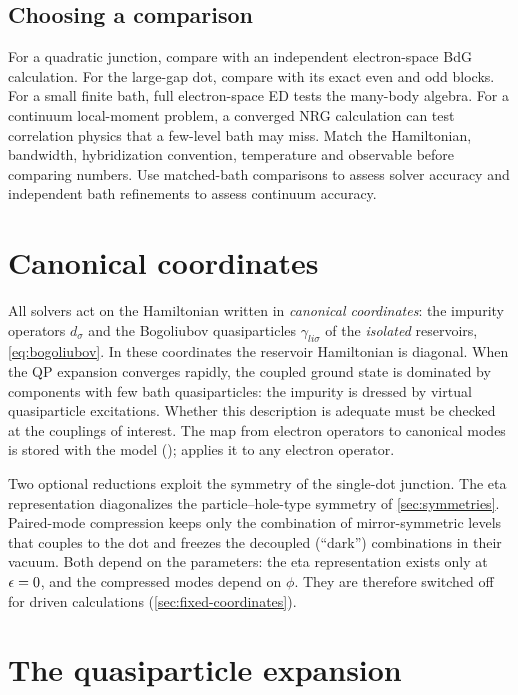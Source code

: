 \subsection{Choosing a comparison}

For a quadratic junction, compare with an independent electron-space BdG
calculation. For the large-gap dot, compare with its exact even and odd blocks.
For a small finite bath, full electron-space ED tests the many-body algebra.
For a continuum local-moment problem, a converged NRG calculation can test
correlation physics that a few-level bath may miss. Match the Hamiltonian,
bandwidth, hybridization convention, temperature and observable before comparing
numbers. Use matched-bath comparisons to assess solver accuracy and independent
bath refinements to assess continuum accuracy.

\section{Canonical coordinates}\label{sec:coordinates}

All solvers act on the Hamiltonian written in \emph{canonical coordinates}: the impurity
operators $d_\sigma$ and the Bogoliubov quasiparticles $\gamma_{li\sigma}$ of the
\emph{isolated} reservoirs, \cref{eq:bogoliubov}. In these coordinates the reservoir
Hamiltonian is diagonal. When the QP expansion converges rapidly, the coupled
ground state is dominated by components with few bath quasiparticles: the
impurity is dressed by virtual quasiparticle excitations. Whether this description
is adequate must be checked at the couplings of interest. The
map from electron operators to canonical modes is stored with the model
();  applies it to any electron
operator.

Two optional reductions exploit the symmetry of the single-dot junction. The eta
representation diagonalizes the particle--hole-type symmetry of \cref{sec:symmetries}.
Paired-mode compression keeps only the combination of mirror-symmetric levels that couples
to the dot and freezes the decoupled (\enquote{dark}) combinations in their vacuum. Both
depend on the parameters: the eta representation exists only at $\epsilon=0$, and the
compressed modes depend on $\phi$. They are therefore switched off for driven calculations
(\cref{sec:fixed-coordinates}).

\section{The quasiparticle expansion}\label{sec:qp}

